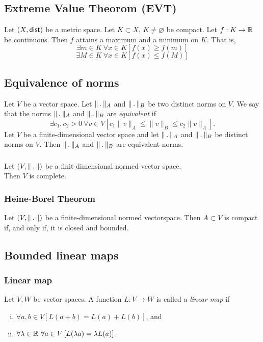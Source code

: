\subsection{Extreme Value Theorom (EVT)}
\uthm Let $(X, \mathsf{dist})$ be a metric space. Let $K \subset X$, $K \neq \varnothing$
be compact. Let $f : K \to \mathbb{R}$ be continuous. Then $f$ attains a maximum and
a minimum on $K$. That is,
\[
    \exists m \in K\ \forall x \in K \left[ f(x) \geq f(m) \right]
\]
\[
    \exists M \in K\ \forall x \in K \left[ f(x) \leq f(M) \right]
\]


\subsection{Equivalence of norms}
\udef Let $V$ be a vector space. Let $\norm_A$ and $\norm_B$ be two distinct
norms on $V$. We say that the norms $\norm_A$ and $\norm_B$ are \emph{equivalent}
if
\[
    \exists c_1, c_2 > 0\ \forall v \in V
    \left[ c_1 \| v \|_A \leq \| v \|_B \leq c_2 \| v \|_A \right].
\]
\uthm Let $V$ be a finite-dimensional vector space and let $\norm_A$ and $\norm_B$
be distinct norms on $V$. Then $\norm_A$ and $\norm_B$ are equivalent norms.

\subsubsection*{}
\uthm Let $(V, \norm)$ be a finit-dimensional normed vector space.\\
Then $V$ is complete.

\subsubsection*{Heine-Borel Theorom}
Let $(V, \norm)$ be a finite-dimensional normed vectorspace. Then $A \subset V$
is compact if, and only if, it is closed and bounded.

\newpage

\subsection{Bounded linear maps}
\subsubsection*{Linear map}
\udef Let $V,W$ be vector spaces. A function $L : V \to W$ is called
a \emph{linear map} if
\begin{enumerate}[(i)]
    \item $\forall a, b \in V \left[ L(a+b) = L(a) + L(b) \right]$, and
    \item $\forall \lambda \in \mathbb{R}\ \forall a \in V \left[ L(\lambda a) = \lambda L(a) \right]$.
\end{enumerate}


